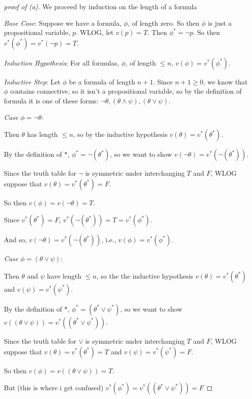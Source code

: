 \documentclass{article}
\theoremstyle{remark}\newtheorem{remark}{Remark}
\begin{document}
\begin{proof}[proof of (a)]
    We proceed by induction on the length of a formula

    \textit{Base Case}: Suppose we have a formula, $\phi$, of length zero. So then $\phi$ is just a propositional variable, $p$. WLOG, let $v(p) = T$. Then $\phi^* = \neg p$. So then $v^* (\phi^*) = v^*(\neg p) = T$.

    \textit{Induction Hypothesis}: For all formulas, $\phi$, of length $\leq n$, $v(\phi) = v^*(\phi^*)$.

    \textit{Inductive Step}: Let $\phi$ be a formula of length $n + 1$. Since $n + 1 \geq 0$, we know that $\phi$ contains connective, so it isn't a propositional variable, so by the definition of formula it is one of these forms: $\neg \theta, (\theta \land \psi), (\theta \lor \psi)$.

    \textit{Case $\phi = \neg \theta$}: 
    
    Then $\theta$ has length $\leq n$, so by the inductive hypothesis $v(\theta) = v^*(\theta^*)$.

    By the definition of $*$, $\phi^* = \neg (\theta^*)$, so we want to show $v(\neg\theta) = v^* (\neg(\theta^*))$.
    
    Since the truth table for $\neg$ is symmetric under interchanging $T$ and $F$, WLOG suppose that $v(\theta) = v^* (\theta^*) = F$.
    
    So then $v(\phi) = v(\neg \theta) = T$.

    Since $v^* (\theta^*) = F$, $v^*(\neg (\theta^*)) = T = v^*(\phi^*)$.

    And so, $v(\neg\theta) = v^* (\neg(\theta^*))$, i.e., $v(\phi) = v^*(\phi^*)$.


    



    
    \textit{Case $\phi = (\theta \lor \psi)$}: 

    Then $\theta$ and $\psi$ have length $\leq n$, so the the inductive hypothesis $v(\theta) = v^*(\theta^*)$ and $v(\psi) = v^*(\psi^*)$.

    By the definition of $*$, $\phi^* = (\theta^* \lor \psi^*)$, so we want to show $v((\theta \lor \psi)) = v^*((\theta^* \lor \psi^*))$.

    Since the truth table for $\lor$ is symmetric under interchanging $T$ and $F$, WLOG suppose that $v(\theta) = v^* (\theta^*) = T$ and $v(\psi) = v^* (\psi^*) = F$.

    So then $v(\phi) = v((\theta \lor \psi)) = T$.

    But (this is where i get confused)
    $v^*(\phi^*) = v^*((\theta^* \lor \psi^*)) = F$
    
    
\end{proof}
\end{document}

